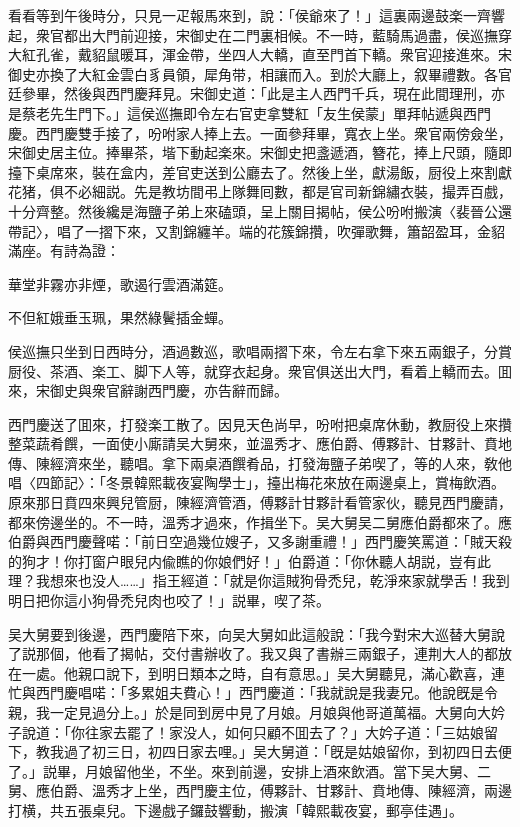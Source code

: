看看等到午後時分，只見一疋報馬來到，說：「侯爺來了！」這裏兩邊鼓楽一齊響起，衆官都出大門前迎接，宋御史在二門裏相候。不一時，藍騎馬過盡，侯巡撫穿大紅孔雀，戴貂鼠暖耳，渾金帶，坐四人大轎，直至門首下轎。衆官迎接進來。宋御史亦換了大紅金雲白豸員領，犀角带，相讓而入。到於大廳上，叙畢禮數。各官廷參畢，然後與西門慶拜見。宋御史道：「此是主人西門千兵，現在此間理刑，亦是蔡老先生門下。」這侯巡撫即令左右官吏拿雙紅「友生侯蒙」單拜帖遞與西門慶。西門慶雙手接了，吩咐家人捧上去。一面參拜畢，寬衣上坐。衆官兩傍僉坐，宋御史居主位。捧畢茶，堦下動起楽來。宋御史把盞遞酒，簪花，捧上尺頭，隨即擡下桌席來，裝在盒内，差官吏送到公廳去了。然後上坐，獻湯飯，厨役上來割獻花猪，俱不必細説。先是教坊間弔上隊舞囘數，都是官司新錦繡衣裝，撮弄百戲，十分齊整。然後纔是海鹽子弟上來磕頭，呈上關目揭帖，侯公吩咐搬演〈裴晉公還帶記〉，唱了一摺下來，又割錦纏羊。端的花簇錦攢，吹彈歌舞，簫韶盈耳，金貂滿座。有詩為證：

\begin{myquote}
華堂非霧亦非煙，歌遏行雲酒滿筵。

不但紅娥垂玉珮，果然綠鬢插金蟬。
\end{myquote}

侯巡撫只坐到日西時分，酒過數巡，歌唱兩摺下來，令左右拿下來五兩銀子，分賞厨役、茶酒、楽工、脚下人等，就穿衣起身。衆官俱送出大門，看着上轎而去。囬來，宋御史與衆官辭謝西門慶，亦告辭而歸。

西門慶送了囬來，打發楽工散了。因見天色尚早，吩咐把桌席休動，教厨役上來攢整菜蔬肴饌，一面使小廝請吴大舅來，並溫秀才、應伯爵、傅夥計、甘夥計、賁地傳、陳經濟來坐，聽唱。拿下兩桌酒饌肴品，打發海鹽子弟喫了，等的人來，敎他唱〈四節記〉：「冬景韓熙載夜宴陶學士」，擡出梅花來放在兩邊桌上，賞梅飲酒。原來那日賁四來興兒管厨，陳經濟管酒，傅夥計甘夥計看管家伙，聽見西門慶請，都來傍邊坐的。不一時，溫秀才過來，作揖坐下。吴大舅吴二舅應伯爵都來了。應伯爵與西門慶聲喏：「前日空過幾位嫂子，又多謝重禮！」西門慶笑罵道：「賊天殺的狗才！你打窗户眼兒内偸瞧的你娘們好！」伯爵道：「你休聽人胡説，豈有此理？我想來也没人……」指王經道：「就是你這賊狗骨禿兒，乾淨來家就學舌！我到明日把你這小狗骨禿兒肉也咬了！」説畢，喫了茶。

吴大舅要到後邊，西門慶陪下來，向吴大舅如此這般說：「我今對宋大巡替大舅說了説那個，他看了揭帖，交付書辦收了。我又與了書辦三兩銀子，連荆大人的都放在一處。他親口說下，到明日類本之時，自有意思。」吴大舅聽見，滿心歡喜，連忙與西門慶唱喏：「多累姐夫費心！」西門慶道：「我就說是我妻兄。他說旣是令親，我一定見過分上。」於是同到房中見了月娘。月娘與他哥道萬福。大舅向大妗子說道：「你往家去罷了！家没人，如何只顧不囬去了？」大妗子道：「三姑娘留下，教我過了初三日，初四日家去哩。」吴大舅道：「旣是姑娘留你，到初四日去便了。」説畢，月娘留他坐，不坐。來到前邊，安排上酒來飲酒。當下吴大舅、二舅、應伯爵、溫秀才上坐，西門慶主位，傅夥計、甘夥計、賁地傳、陳經濟，兩邊打横，共五張桌兒。下邊戲子鑼鼓響動，搬演「韓熙載夜宴，郵亭佳遇」。


